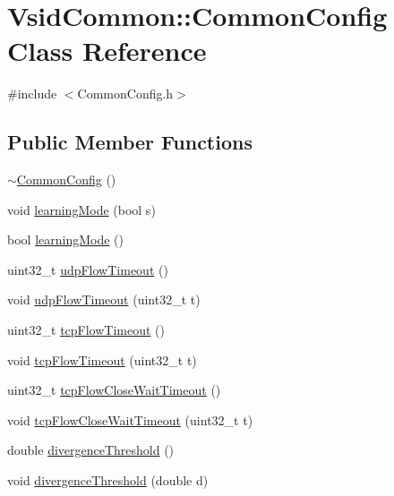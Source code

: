\hypertarget{class_vsid_common_1_1_common_config}{\section{Vsid\-Common\-:\-:Common\-Config Class Reference}
\label{class_vsid_common_1_1_common_config}
}


{\ttfamily \#include $<$Common\-Config.\-h$>$}

\subsection*{Public Member Functions}
\begin{DoxyCompactItemize}
\item 
\hyperlink{class_vsid_common_1_1_common_config_a8028749b5c7aeed73b4eea1f1cc69225}{$\sim$\-Common\-Config} ()
\item 
void \hyperlink{class_vsid_common_1_1_common_config_a8bda249a92fb694cddb16a3610b46fb4}{learning\-Mode} (bool s)
\item 
bool \hyperlink{class_vsid_common_1_1_common_config_a216a694d57121993d109e429cfc493a5}{learning\-Mode} ()
\item 
uint32\-\_\-t \hyperlink{class_vsid_common_1_1_common_config_a60ebee6b72a64b11236b893417f84e72}{udp\-Flow\-Timeout} ()
\item 
void \hyperlink{class_vsid_common_1_1_common_config_a63a915ba699f1dd2e5e4162d7213f151}{udp\-Flow\-Timeout} (uint32\-\_\-t t)
\item 
uint32\-\_\-t \hyperlink{class_vsid_common_1_1_common_config_af2130266e27cc2b8cf135e4ba499aaa5}{tcp\-Flow\-Timeout} ()
\item 
void \hyperlink{class_vsid_common_1_1_common_config_a5f878699e82ff4bf10310d05f4b690f3}{tcp\-Flow\-Timeout} (uint32\-\_\-t t)
\item 
uint32\-\_\-t \hyperlink{class_vsid_common_1_1_common_config_a7005e5b9127c2c58525b81a10805e255}{tcp\-Flow\-Close\-Wait\-Timeout} ()
\item 
void \hyperlink{class_vsid_common_1_1_common_config_a17a79b6a931f79eacb7f221b6b8524d4}{tcp\-Flow\-Close\-Wait\-Timeout} (uint32\-\_\-t t)
\item 
double \hyperlink{class_vsid_common_1_1_common_config_ac08bbad3a85c8ba4e43a591f7f02fe06}{divergence\-Threshold} ()
\item 
void \hyperlink{class_vsid_common_1_1_common_config_af8404c1a7e41d8fc986e5ddba14cb264}{divergence\-Threshold} (double d)

\end{DoxyCompactItemize}

